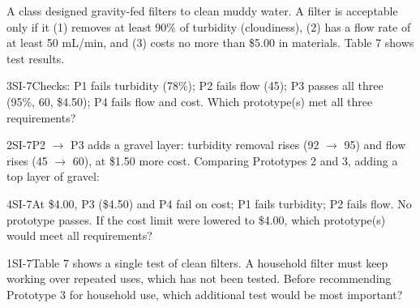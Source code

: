 \documentclass[11pt]{article}
\begin{document}
A class designed gravity-fed filters to clean muddy water. A filter is acceptable only if it (1) removes at least 90\% of turbidity (cloudiness), (2) has a flow rate of at least 50 mL/min, and (3) costs no more than \$5.00 in materials. Table 7 shows test results.

\passageend

\begin{q}{3}{SI-7}{Checks: P1 fails turbidity (78\%); P2 fails flow (45); P3 passes all three (95\%, 60, \$4.50); P4 fails flow and cost.}
Which prototype(s) met all three requirements?
\end{q}

\begin{q}{2}{SI-7}{P2 $\to$ P3 adds a gravel layer: turbidity removal rises (92 $\to$ 95) and flow rises (45 $\to$ 60), at \$1.50 more cost.}
Comparing Prototypes 2 and 3, adding a top layer of gravel:
\end{q}

\begin{q}{4}{SI-7}{At \$4.00, P3 (\$4.50) and P4 fail on cost; P1 fails turbidity; P2 fails flow. No prototype passes.}
If the cost limit were lowered to \$4.00, which prototype(s) would meet all requirements?
\end{q}

\begin{q}{1}{SI-7}{Table 7 shows a single test of clean filters. A household filter must keep working over repeated uses, which has not been tested.}
Before recommending Prototype 3 for household use, which additional test would be most important?
\end{q}
\end{document}
